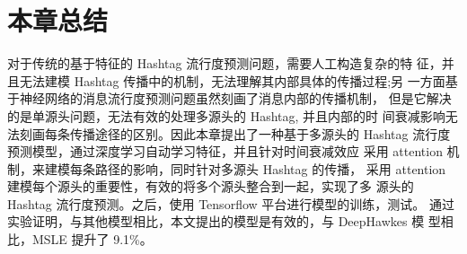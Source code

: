 \section{本章总结}

对于传统的基于特征的 Hashtag 流行度预测问题，需要人工构造复杂的特 征，并且无法建模 Hashtag 传播中的机制，无法理解其内部具体的传播过程;另 一方面基于神经网络的消息流行度预测问题虽然刻画了消息内部的传播机制， 但是它解决的是单源头问题，无法有效的处理多源头的 Hashtag, 并且内部的时 间衰减影响无法刻画每条传播途径的区别。因此本章提出了一种基于多源头的 Hashtag 流行度预测模型，通过深度学习自动学习特征，并且针对时间衰减效应 采用 attention 机制，来建模每条路径的影响，同时针对多源头 Hashtag 的传播， 采用 attention 建模每个源头的重要性，有效的将多个源头整合到一起，实现了多 源头的 Hashtag 流行度预测。之后，使用 Tensorflow 平台进行模型的训练，测试。 通过实验证明，与其他模型相比，本文提出的模型是有效的，与 DeepHawkes 模 型相比，MSLE 提升了 9.1\%。